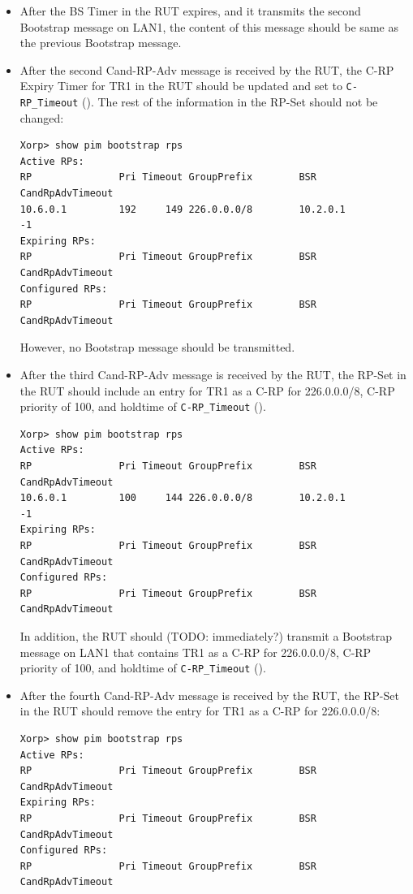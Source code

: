 \documentclass[11pt]{report}
\begin{document}
\begin{itemize}
  \item After the BS Timer in the RUT expires, and it transmits the second
  Bootstrap message on LAN1, the content of this message should be same as the
  previous Bootstrap message.

  \item After the second Cand-RP-Adv message is received by the RUT, the C-RP
  Expiry Timer for TR1 in the RUT should be updated and set to
  \verb=C-RP_Timeout= ({\PimsmCRPTimeout}). The rest of the information in the
  RP-Set should not be changed:

\begin{verbatim}
Xorp> show pim bootstrap rps 
Active RPs:
RP               Pri Timeout GroupPrefix        BSR         CandRpAdvTimeout
10.6.0.1         192     149 226.0.0.0/8        10.2.0.1                  -1
Expiring RPs:
RP               Pri Timeout GroupPrefix        BSR         CandRpAdvTimeout
Configured RPs:
RP               Pri Timeout GroupPrefix        BSR         CandRpAdvTimeout
\end{verbatim}

  However, no Bootstrap message should be transmitted.

  \item After the third Cand-RP-Adv message is received by the RUT, the RP-Set
  in the RUT should include an entry for TR1 as a C-RP for 226.0.0.0/8,
  C-RP priority of 100, and holdtime of \verb=C-RP_Timeout=
  ({\PimsmCRPTimeout}).

\begin{verbatim}
Xorp> show pim bootstrap rps 
Active RPs:
RP               Pri Timeout GroupPrefix        BSR         CandRpAdvTimeout
10.6.0.1         100     144 226.0.0.0/8        10.2.0.1                  -1
Expiring RPs:
RP               Pri Timeout GroupPrefix        BSR         CandRpAdvTimeout
Configured RPs:
RP               Pri Timeout GroupPrefix        BSR         CandRpAdvTimeout
\end{verbatim}

  In addition, the RUT should (TODO: immediately?) transmit a Bootstrap
  message on LAN1 that contains TR1 as a C-RP for 226.0.0.0/8,
  C-RP priority of 100, and holdtime of \verb=C-RP_Timeout=
  ({\PimsmCRPTimeout}).

  \item After the fourth Cand-RP-Adv message is received by the RUT, the RP-Set
  in the RUT should remove the entry for TR1 as a C-RP for 226.0.0.0/8:

\begin{verbatim}
Xorp> show pim bootstrap rps 
Active RPs:
RP               Pri Timeout GroupPrefix        BSR         CandRpAdvTimeout
Expiring RPs:
RP               Pri Timeout GroupPrefix        BSR         CandRpAdvTimeout
Configured RPs:
RP               Pri Timeout GroupPrefix        BSR         CandRpAdvTimeout
\end{verbatim}


\end{itemize}
\end{document}
